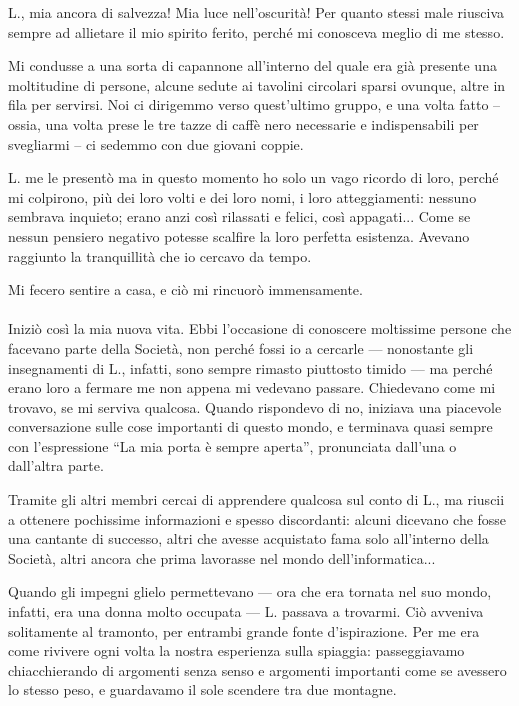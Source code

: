 \documentclass[a4paper,12pt]{book}
\begin{document}
L., mia ancora di salvezza! Mia luce nell'oscurità! Per quanto stessi male
riusciva sempre ad allietare il mio spirito ferito, perché mi conosceva meglio
di me stesso.

Mi condusse a una sorta di capannone all'interno del quale era già presente una
moltitudine di persone, alcune sedute ai tavolini circolari sparsi ovunque,
altre in fila per servirsi. Noi ci dirigemmo verso quest'ultimo gruppo, e una
volta fatto -- ossia, una volta prese le tre tazze di caffè nero necessarie e
indispensabili per svegliarmi -- ci sedemmo con due giovani coppie.

L. me le presentò ma in questo momento ho solo un vago ricordo di loro, perché
mi colpirono, più dei loro volti e dei loro nomi, i loro atteggiamenti: nessuno
sembrava inquieto; erano anzi così rilassati e felici, così appagati... Come se
nessun pensiero negativo potesse scalfire la loro perfetta esistenza. Avevano
raggiunto la tranquillità che io cercavo da tempo.

Mi fecero sentire a casa, e ciò mi rincuorò immensamente.

\paragraph{}
Iniziò così la mia nuova vita. Ebbi l'occasione di conoscere moltissime persone
che facevano parte della Società, non perché fossi io a cercarle --- nonostante
gli insegnamenti di L., infatti, sono sempre rimasto piuttosto timido --- ma
perché erano loro a fermare me non appena mi vedevano passare. Chiedevano come
mi trovavo, se mi serviva qualcosa. Quando rispondevo di no, iniziava una
piacevole conversazione sulle cose importanti di questo mondo, e terminava
quasi sempre con l'espressione ``La mia porta è sempre aperta'', pronunciata
dall'una o dall'altra parte.

Tramite gli altri membri cercai di apprendere qualcosa sul conto di L., ma
riuscii a ottenere pochissime informazioni e spesso discordanti: alcuni dicevano
che fosse una cantante di successo, altri che avesse acquistato fama solo
all'interno della Società, altri ancora che prima lavorasse nel mondo
dell'informatica...

Quando gli impegni glielo permettevano --- ora che era tornata nel suo mondo,
infatti, era una donna molto occupata --- L. passava a trovarmi. Ciò avveniva
solitamente al tramonto, per entrambi grande fonte d'ispirazione. Per me era
come rivivere ogni volta la nostra esperienza sulla spiaggia: passeggiavamo
chiacchierando di argomenti senza senso e argomenti importanti come se avessero
lo stesso peso, e guardavamo il sole scendere tra due montagne.
\end{document}
